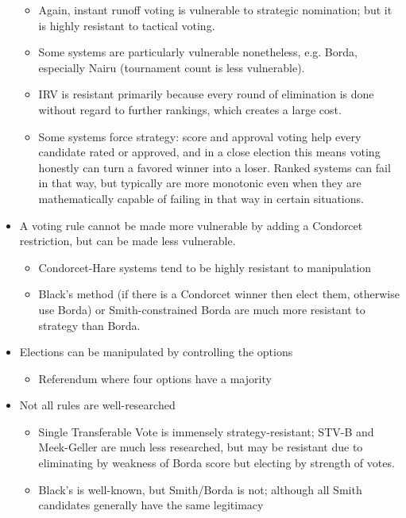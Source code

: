 \begin{itemize}
\begin{itemize}
        \item Again, instant runoff voting is vulnerable to strategic nomination; but it is highly resistant to tactical voting.
        \item Some systems are particularly vulnerable nonetheless, e.g. Borda, especially Nairu (tournament count is less vulnerable).

        \item IRV is resistant primarily because every round of elimination is done without regard to further rankings, which creates a large cost.

        \item Some systems force strategy:  score and approval voting help every candidate rated or approved, and in a close election this means voting honestly can turn a favored winner into a loser.  Ranked systems can fail in that way, but typically are more monotonic even when they are mathematically capable of failing in that way in certain situations.
    \end{itemize}

    \item A voting rule cannot be made more vulnerable by adding a Condorcet restriction, but can be made less vulnerable.
    \begin{itemize}
        \item Condorcet-Hare systems tend to be highly resistant to manipulation

        \item Black's method (if there is a Condorcet winner then elect them, otherwise use Borda) or Smith-constrained Borda are much more resistant to strategy than Borda.
    \end{itemize}

    \item Elections can be manipulated by controlling the options
    \begin{itemize}
        \item Referendum where four options have a majority
    \end{itemize}

    \item Not all rules are well-researched
    \begin{itemize}
        \item Single Transferable Vote is immensely strategy-resistant; STV-B and Meek-Geller are much less researched, but may be resistant due to eliminating by weakness of Borda score but electing by strength of votes.

        \item Black's is well-known, but Smith/Borda is not; although all Smith candidates generally have the same legitimacy

    \end{itemize}

\end{itemize}

